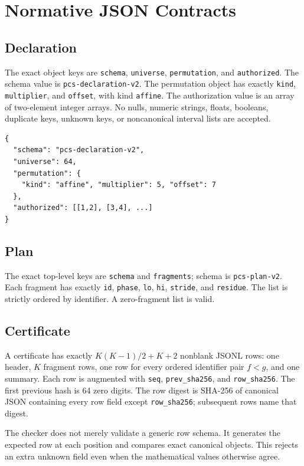 \documentclass[11pt,onecolumn]{IEEEtran}
\newcommand{\code}[1]{\texttt{#1}}
\begin{document}
\section{Normative JSON Contracts}
\subsection{Declaration}
The exact object keys are \code{schema}, \code{universe}, \code{permutation}, and \code{authorized}.  The schema value is \code{pcs-declaration-v2}.  The permutation object has exactly \code{kind}, \code{multiplier}, and \code{offset}, with kind \code{affine}.  The authorization value is an array of two-element integer arrays.  No nulls, numeric strings, floats, booleans, duplicate keys, unknown keys, or noncanonical interval lists are accepted.

\begin{verbatim}
{
  "schema": "pcs-declaration-v2",
  "universe": 64,
  "permutation": {
    "kind": "affine", "multiplier": 5, "offset": 7
  },
  "authorized": [[1,2], [3,4], ...]
}
\end{verbatim}

\subsection{Plan}
The exact top-level keys are \code{schema} and \code{fragments}; schema is \code{pcs-plan-v2}.  Each fragment has exactly \code{id}, \code{phase}, \code{lo}, \code{hi}, \code{stride}, and \code{residue}.  The list is strictly ordered by identifier.  A zero-fragment list is valid.

\subsection{Certificate}
A certificate has exactly $K(K-1)/2+K+2$ nonblank JSONL rows: one header, $K$ fragment rows, one row for every ordered identifier pair $f<g$, and one summary.  Each row is augmented with \code{seq}, \code{prev\_sha256}, and \code{row\_sha256}.  The first previous hash is 64 zero digits.  The row digest is SHA-256 of canonical JSON containing every row field except \code{row\_sha256}; subsequent rows name that digest.

The checker does not merely validate a generic row schema.  It generates the expected row at each position and compares exact canonical objects.  This rejects an extra unknown field even when the mathematical values otherwise agree.
\end{document}
